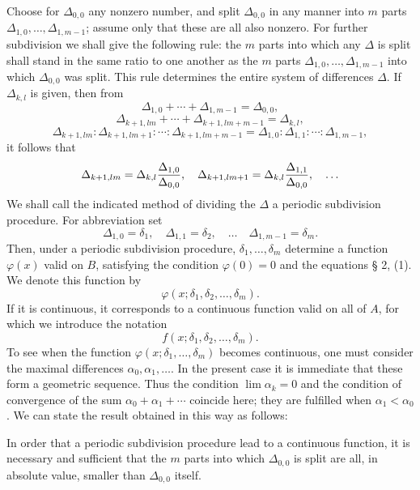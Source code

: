 \documentclass[11pt,a4paper]{article}
\begin{document}
Choose for $\Delta_{0,0}$ any nonzero number, and split $\Delta_{0,0}$ in any manner into $m$ parts $\Delta_{1,0},\ldots,\Delta_{1,m-1}$; assume only that these are all also nonzero. For further subdivision we shall give the following rule: the $m$ parts into which any $\Delta$ is split shall stand in the same ratio to one another as the $m$ parts $\Delta_{1,0},\ldots,\Delta_{1,m-1}$ into which $\Delta_{0,0}$ was split. This rule determines the entire system of differences $\Delta$. If $\Delta_{k,l}$ is given, then from
\[
 \Delta_{1,0}+\cdots+\Delta_{1,m-1}=\Delta_{0,0},
\]
\[
 \Delta_{k+1,lm}+\cdots+\Delta_{k+1,lm+m-1}=\Delta_{k,l},
\]
\[
 \Delta_{k+1,lm}:\Delta_{k+1,lm+1}:\cdots:\Delta_{k+1,lm+m-1}
 =\Delta_{1,0}:\Delta_{1,1}:\cdots:\Delta_{1,m-1},
\]
it follows that
\[
 \Delta_{k+1,lm}=\Delta_{k,l}{\Delta_{1,0}\over\Delta_{0,0}},
 \quad
 \Delta_{k+1,lm+1}=\Delta_{k,l}{\Delta_{1,1}\over\Delta_{0,0}},
 \quad\ldots
\]
We shall call the indicated method of dividing the $\Delta$ a periodic subdivision procedure. For abbreviation set
\[
 \Delta_{1,0}=\delta_1,
 \quad
 \Delta_{1,1}=\delta_2,
 \quad\ldots\quad
 \Delta_{1,m-1}=\delta_m.
\]
Then, under a periodic subdivision procedure, $\delta_1,\ldots,\delta_m$ determine a function $\varphi(x)$ valid on $B$, satisfying the condition $\varphi(0)=0$ and the equations § 2, (1). We denote this function by
\[
 \varphi(x;\delta_1,\delta_2,\ldots,\delta_m).
\]
If it is continuous, it corresponds to a continuous function valid on all of $A$, for which we introduce the notation
\[
 f(x;\delta_1,\delta_2,\ldots,\delta_m).
\]
To see when the function $\varphi(x;\delta_1,
\ldots,
\delta_m)$ becomes continuous, one must consider the maximal differences $\alpha_0,\alpha_1,
\ldots$. In the present case it is immediate that these form a geometric sequence. Thus the condition $\lim\alpha_k=0$ and the condition of convergence of the sum $\alpha_0+\alpha_1+\cdots$ coincide here; they are fulfilled when $\alpha_1<\alpha_0$. We can state the result obtained in this way as follows:

In order that a periodic subdivision procedure lead to a continuous function, it is necessary and sufficient that the $m$ parts into which $\Delta_{0,0}$ is split are all, in absolute value, smaller than $\Delta_{0,0}$ itself.
\end{document}
